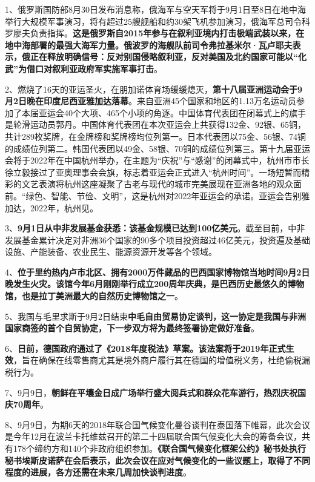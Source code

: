 1、俄罗斯国防部8月30日发布消息称，俄海军与空天军将于9月1日至8日在地中海举行大规模军事演习，将有超过25艘舰船和约30架飞机参加演习，俄海军总司令科罗廖夫负责指挥。{\textbf{这是俄罗斯自2015年参与在叙利亚境内打击极端武装以来，在地中海部署的最强大海军力量。俄波罗的海舰队前司令弗拉基米尔·瓦卢耶夫表示，俄正在释放明确信号：反对别国侵略叙利亚，反对美国及北约国家可能以``化武''为借口对叙利亚政府军实施军事打击}}。

2、燃烧了16天的亚运圣火，在朋加诺体育场缓缓熄灭，{\textbf{第十八届亚洲运动会于9月2日晚在印度尼西亚雅加达落幕}}。来自亚洲45个国家和地区的1.13万名运动员参加了本届亚运会40个大项、465个小项的角逐。中国体育代表团在闭幕式上的旗手是轮滑运动员郭丹。中国体育代表团在本次亚运会上共获得132金、92银、65铜，共计289枚奖牌，在金牌榜和奖牌榜均位列第一。日本代表团以75金、56银、74铜的成绩位列第二。韩国代表团以49金、58银、70铜的成绩位列第三。第十九届亚运会将于2022年在中国杭州举办，在主题为``庆祝''与``感谢''的闭幕式中，杭州市市长徐立毅接过了亚奥理事会会旗，标志着亚运会正式进入``杭州时间''。一场短暂而精彩的文艺表演将杭州这座凝聚了古老与现代的城市完美展现在亚洲各地的观众面前。``绿色、智能、节俭、文明''，这是杭州对2022年亚运会的承诺。亚运会告别雅加达，2022年，杭州见。

3、{\textbf{9月1日从中非发展基金获悉：该基金规模已达到100亿美元}}。截至目前，中非发展基金累计决定对非洲36个国家的90多个项目投资超过46亿美元，投资遍及基础设施、产能装备、农业民生、能源资源开发等各个领域。

4、{\textbf{位于里约热内卢市北区、拥有2000万件藏品的巴西国家博物馆当地时间9月2日晚发生火灾。该馆今年6月刚刚举行成立200周年庆典，是巴西历史最悠久的博物馆，也是拉丁美洲最大的自然历史博物馆之一}}。

5、我国与毛里求斯于9月2日结束{\textbf{中毛自由贸易协定谈判，这一协定是我国与非洲国家商签的首个自贸协定，下一步双方将为最终签署协定做好准备}}。

6、{\textbf{日前，德国政府通过了《2018年度税法》草案。该法案将于2019年正式生效}}，旨在确保在线零售商尤其是境外商户履行其在德国的增值税义务，杜绝偷税漏税行为。

7、9月9日，{\textbf{朝鲜在平壤金日成广场举行盛大阅兵式和群众花车游行，热烈庆祝国庆70周年}}。

8、9月9日，为期6天的2018年联合国气候变化曼谷谈判在泰国落下帷幕，此次会议是今年12月在波兰卡托维兹召开的第二十四届联合国气候变化大会的筹备会议，共有178个缔约方和140个非政府组织参加。{\textbf{《联合国气候变化框架公约》秘书处执行秘书埃斯皮诺萨在会后表示，此次会议在应对气候变化的一些议题上，取得了不同程度的进展，各方还需在未来几周加快谈判进度}}。

